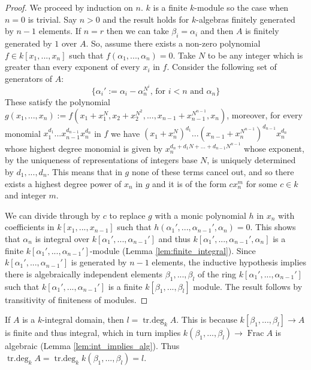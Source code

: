 \documentclass[12pt]{article}
\theoremstyle{plain}
\theoremstyle{definition}
\newcommand{\lto}{\longrightarrow}
\begin{document}
	\begin{proof}
		We proceed by induction on $n$. $k$ is a finite $k$-module so the case when $n =0$ is trivial. Say $n > 0$ and the result holds for $k$-algebras finitely generated by $n-1$ elements. If $n = r$ then we can take $\beta_i = \alpha_i$ and then $A$ is finitely generated by $1$ over $A$. So, assume there exists a non-zero polynomial $f \in k[x_1,...,x_n]$ such that $f(\alpha_1,...,\alpha_n) = 0$. Take $N$ to be any integer which is greater than every exponent of every $x_i$ in $f$. Consider the following set of generators of $A$:
		\[\lbrace \alpha_i' := \alpha_i - \alpha_n^{N^i}\text{,  for }i < n\text{ and }\alpha_n\rbrace\]
		These satisfy the polynomial $g(x_1,...,x_n) := f(x_1 + x_1^{N},x_2 + x_2^{N^2},...,x_{n-1} + x_{n-1}^{N^{n-1}}, x_n)$, moreover, for every monomial $x_1^{d_1}...x_{n-1}^{d_{n-1}}x_{n}^{d_n}$ in $f$ we have $(x_1 + x_n^N)^{d_1}...(x_{n-1} + x_{n}^{N^{n-1}})^{d_{n-1}}x_n^{d_n}$ whose highest degree monomial is given by $x_n^{d_n + d_1N + ... + d_{n-1}N^{n-1}}$ whose exponent, by the uniqueness of representations of integers base $N$, is uniquely determined by $d_1,...,d_n$. This means that in $g$ none of these terms cancel out, and so there exists a highest degree power of $x_n$ in $g$ and it is of the form $cx_n^m$ for some $c \in k$ and integer $m$.
		
		We can divide through by $c$ to replace $g$ with a monic polynomial $h$ in $x_n$ with coefficients in $k[x_1,...,x_{n-1}]$ such that $h(\alpha_1',...,\alpha_{n-1}',\alpha_n) = 0$. This shows that $\alpha_n$ is integral over $k[\alpha_1',...,\alpha_{n-1}']$ and thus $k[\alpha_1',...,\alpha_{n-1}',\alpha_n]$ is a finite $k[\alpha_1',...,\alpha_{n-1}']$-module (Lemma \ref{lem:finite_integral}). Since $k[\alpha_1',...,\alpha_{n-1}']$ is generated by $n-1$ elements, the inductive hypothesis implies there is algebraically independent elements $\beta_1,...,\beta_{l}$ of the ring $k[\alpha_1',...,\alpha_{n-1}']$ such that $k[\alpha_1',...,\alpha_{n-1}']$ is a finite $k[\beta_1,...,\beta_l]$ module. The result follows by transitivity of finiteness of modules.
	\end{proof}
	If $A$ is a $k$-integral domain, then $l = \operatorname{tr.deg}_kA$. This is because $k[\beta_1,...,\beta_l] \lto A$ is finite and thus integral, which in turn implies $k(\beta_1,...,\beta_l) \lto \operatorname{Frac}A$ is algebraic (Lemma \ref{lem:int_implies_alg}). Thus $\operatorname{tr.deg}_kA = \operatorname{tr.deg}_kk(\beta_1,...,\beta_l) = l$.
\end{document}
